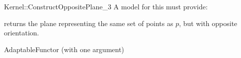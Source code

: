 \begin{ccRefFunctionObjectConcept}{Kernel::ConstructOppositePlane_3}
A model for this must provide:


{returns the plane representing the same set of points as $p$,
but with opposite orientation.}

\ccRefines
AdaptableFunctor (with one argument)

\ccSeeAlso
{} \\

\end{ccRefFunctionObjectConcept}
